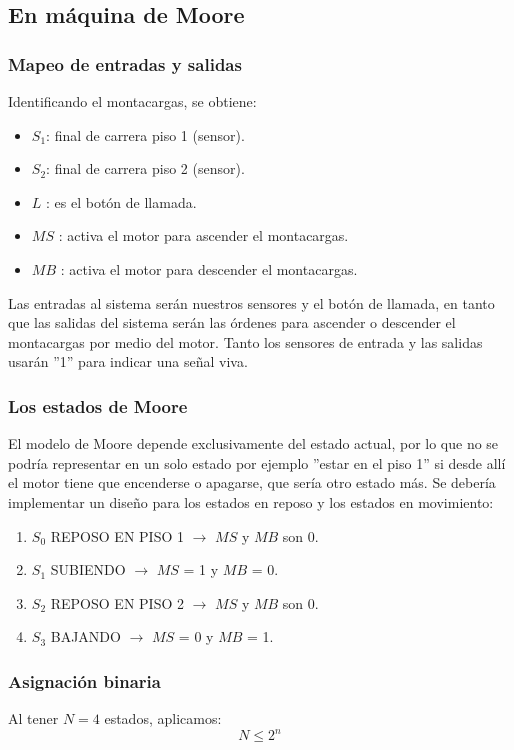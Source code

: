 \subsection{En máquina de Moore}
\subsubsection{Mapeo de entradas y salidas}
\sangria{} Identificando el montacargas, se obtiene:\\[5pt]
\begin{itemize}[nosep]
	\item $S_1$: final de carrera piso 1 (sensor).
	\item $S_2$: final de carrera piso 2 (sensor).
	\item $L$  : es el botón de llamada.
	\item $MS$ : activa el motor para ascender el montacargas.
	\item $MB$ : activa el motor para descender el montacargas.
\end{itemize}
\sangria{} Las entradas al sistema serán nuestros sensores y el botón de llamada, en tanto que las salidas del sistema serán las órdenes para ascender o descender el montacargas por medio del motor. Tanto los sensores de entrada y las salidas usarán ''1'' para indicar una señal viva.
\subsubsection{Los estados de Moore}
\sangria{} El modelo de Moore depende exclusivamente del estado actual, por lo que no se podría representar en un solo estado por ejemplo ''estar en el piso 1'' si desde allí el motor tiene que encenderse o apagarse, que sería otro estado más. Se debería implementar un diseño para los estados en reposo y los estados en movimiento:\\[5pt]
\begin{enumerate}[nosep] 
	\item $S_0$ REPOSO EN PISO 1 $\rightarrow$ $MS$ y $MB$ son 0.
	\item $S_1$ SUBIENDO	$\rightarrow$ $MS$ = 1 y $MB$ = 0.
	\item $S_2$ REPOSO EN PISO 2 $\rightarrow$ $MS$ y $MB$ son 0.
	\item $S_3$ BAJANDO $\rightarrow$ $MS$ = 0 y $MB$ = 1.
\end{enumerate}
\subsubsection{Asignación binaria}
\sangria{} Al tener $N=4$ estados, aplicamos:
\[
	N \leq 2^n
\]

